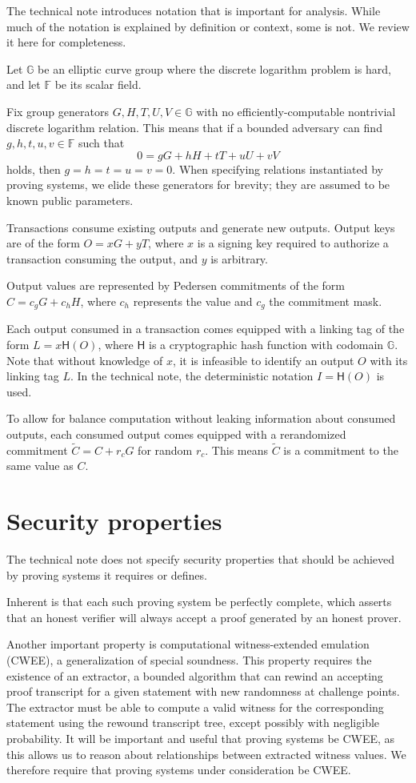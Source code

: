 \documentclass{article}
\theoremstyle{definition}
\newcommand{\GG}{\mathbb{G}}
\newcommand{\FF}{\mathbb{F}}
\newcommand{\hash}{\mathsf{H}}
\newcommand{\wt}[1]{\widetilde{#1}}
\begin{document}
The technical note introduces notation that is important for analysis.
While much of the notation is explained by definition or context, some is not.
We review it here for completeness.

Let $\GG$ be an elliptic curve group where the discrete logarithm problem is hard, and let $\FF$ be its scalar field.

Fix group generators $G, H, T, U, V \in \GG$ with no efficiently-computable nontrivial discrete logarithm relation.
This means that if a bounded adversary can find $g, h, t, u, v \in \FF$ such that
$$0 = g G + h H + t T + u U + v V$$
holds, then $g = h = t = u = v = 0$.
When specifying relations instantiated by proving systems, we elide these generators for brevity; they are assumed to be known public parameters.

Transactions consume existing outputs and generate new outputs.
Output keys are of the form $O = x G + y T$, where $x$ is a signing key required to authorize a transaction consuming the output, and $y$ is arbitrary.

Output values are represented by Pedersen commitments of the form $C = c_g G + c_h H$, where $c_h$ represents the value and $c_g$ the commitment mask.

Each output consumed in a transaction comes equipped with a linking tag of the form $L = x \hash(O)$, where $\hash$ is a cryptographic hash function with codomain $\GG$.
Note that without knowledge of $x$, it is infeasible to identify an output $O$ with its linking tag $L$.
In the technical note, the deterministic notation $I = \hash(O)$ is used.

To allow for balance computation without leaking information about consumed outputs, each consumed output comes equipped with a rerandomized commitment $\wt{C} = C + r_c G$ for random $r_c$.
This means $\wt{C}$ is a commitment to the same value as $C$.


\section{Security properties}

The technical note does not specify security properties that should be achieved by proving systems it requires or defines.

Inherent is that each such proving system be perfectly complete, which asserts that an honest verifier will always accept a proof generated by an honest prover.

Another important property is computational witness-extended emulation (CWEE), a generalization of special soundness.
This property requires the existence of an extractor, a bounded algorithm that can rewind an accepting proof transcript for a given statement with new randomness at challenge points.
The extractor must be able to compute a valid witness for the corresponding statement using the rewound transcript tree, except possibly with negligible probability.
It will be important and useful that proving systems be CWEE, as this allows us to reason about relationships between extracted witness values.
We therefore require that proving systems under consideration be CWEE.
\end{document}
